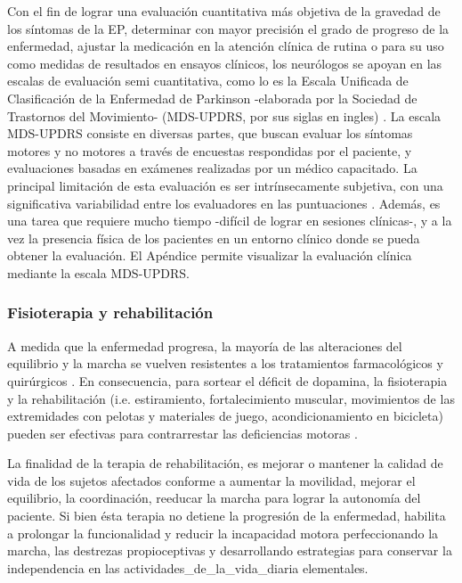 Con el fin de lograr una evaluación cuantitativa más objetiva de la gravedad de los síntomas de la EP, determinar con mayor precisión el grado de progreso de la enfermedad, ajustar la medicación en la atención clínica de rutina o para su uso como medidas de resultados en ensayos clínicos, los neurólogos se apoyan en las escalas de evaluación semi cuantitativa, como lo es la Escala Unificada de Clasificación de la Enfermedad de Parkinson -elaborada por la Sociedad de Trastornos del Movimiento- (MDS-UPDRS, por sus siglas en ingles) \cite{Jellinger2002}. La escala MDS-UPDRS consiste en diversas partes, que buscan evaluar los síntomas motores y no motores a través de encuestas respondidas por el paciente, y evaluaciones basadas en exámenes realizadas por un médico capacitado. La principal limitación de esta evaluación es ser intrínsecamente subjetiva, con una significativa variabilidad entre los evaluadores en las puntuaciones \cite{Parisi2015}. Además, es una tarea que requiere mucho tiempo -difícil de lograr en sesiones clínicas-, y a la vez la presencia física de los pacientes en un entorno clínico donde se pueda obtener la evaluación. El Apéndice  permite visualizar la evaluación clínica mediante la escala MDS-UPDRS.

\subsubsection{Fisioterapia y rehabilitación}

A medida que la enfermedad progresa, la mayoría de las alteraciones del equilibrio y la marcha se vuelven resistentes a los tratamientos farmacológicos y quirúrgicos \cite{Rubinstein2002}. En consecuencia, para sortear el déficit de dopamina, la fisioterapia y la rehabilitación (i.e. estiramiento, fortalecimiento muscular, movimientos de las extremidades con pelotas y materiales de juego, acondicionamiento en bicicleta) pueden ser efectivas para contrarrestar las deficiencias motoras \cite{Fox2008}. 

La finalidad de la terapia de rehabilitación, es mejorar o mantener la calidad de vida de los sujetos afectados conforme a aumentar la movilidad, mejorar el equilibrio, la coordinación, reeducar la marcha para lograr la autonomía del paciente. Si bien ésta terapia no detiene la progresión de la enfermedad, habilita a prolongar la funcionalidad y reducir la incapacidad motora perfeccionando la marcha, las destrezas propioceptivas y desarrollando estrategias para conservar la independencia en las \gls{actividades_de_la_vida_diaria} elementales.

